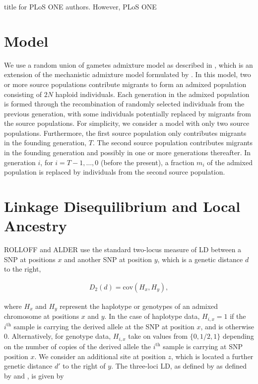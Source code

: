 \begin{table}
\begin{table}
[TODO Could we say anything here about Neanderthals in Asia?]

title for PLoS ONE authors. However, PLoS ONE %
\section{Model} We use a random union of gametes admixture model as described in
\cite{liang2014understanding}, which is an extension of the mechanistic
admixture model formulated by \cite{verdu2011general}. In this model, two or
more source populations contribute migrants to form an admixed population
consisting of $2N$ haploid individuals. Each generation in the admixed
population is formed through the recombination of randomly selected individuals
from the previous generation, with some individuals potentially replaced by
migrants from the source populations. For simplicity, we consider a model with
only two source populations. Furthermore, the first source population only
contributes migrants in the founding generation, $T$. The second source
population contributes migrants in the founding generation and possibly in one
or more generations thereafter. In generation $i$, for $i=T-1,\dots,0$ (before
the present), a fraction $m_i$ of the admixed population is replaced by
individuals from the second source population.

\section{Linkage Disequilibrium and Local Ancestry} ROLLOFF and ALDER use the
standard two-locus measure of LD between a SNP at positions $x$ and another SNP
at position $y$, which is a genetic distance $d$ to the right,

\begin{align} D_2(d) = \text{cov}(H_x,H_y), \label{D2} \end{align}

where $H_x$ and $H_y$ represent the haplotype or genotypes of an admixed
chromosome at positions $x$ and $y$. In the case of haplotype data, $H_{i,x}=1$
if the $i^\text{th}$ sample is carrying the derived allele at the SNP at
position $x$, and is otherwise 0. Alternatively, for genotype data, $H_{i,x}$
take on values from $\{0,1/2,1\}$ depending on the number of copies of the
derived allele the $i^\text{th}$ sample is carrying at SNP position $x$. We
consider an additional site at position $z$, which is located a further genetic
distance $d'$ to the right of $y$. The three-loci LD, as defined by as defined
by \cite{bennett1952theory} and \cite{slatkin1972treating}, is given by


\end{table}
\end{table}
